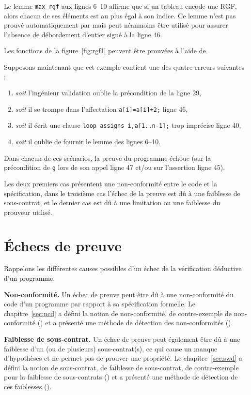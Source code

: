 Le lemme \lstinline'max_rgf' aux lignes 6--10 affirme que si un tableau
encode une RGF, alors chacun de ses éléments est au plus égal à son indice.
Ce lemme n'est pas prouvé automatiquement par \Wp mais peut néanmoins être
utilisé pour assurer l'absence de débordement d'entier signé à la ligne 46.

Les fonctions de la figure~\ref{fig:rgf1} peuvent être prouvées à l'aide de \Wp.

Supposons maintenant que cet exemple contient une des quatre erreurs suivantes :
\begin{enumerate}
\item \emph{soit} l'ingénieur validation oublie la précondition de la ligne 29,
\item \emph{soit} il se trompe dans l'affectation
  \lstinline[style=c]'a[i]=a[i]+2;' ligne 46,
\item \emph{soit} il écrit une clause
  \lstinline[style=c]'loop assigns i,a[1..n-1];' trop imprécise ligne 40,
\item \emph{soit} il oublie de fournir le lemme des lignes 6--10.
\end{enumerate}
Dans chacun de ces scénarios, la preuve du programme échoue (sur la précondition
de \lstinline{g} lors de son appel ligne 47 et/ou sur l'assertion ligne 45).

Les deux premiers cas présentent une non-conformité entre le code et
la spécification, dans le troisième cas l'échec de la preuve est dû à une
faiblesse de sous-contrat, et le dernier cas est dû à une limitation ou une
faiblesse du prouveur utilisé.


\section{Échecs de preuve}
\label{sec:method-proof-failures}


Rappelons les différentes causes possibles d'un échec de la vérification
déductive d'un programme.

\textbf{Non-conformité.}
Un échec de preuve peut être dû à une non-conformité du code d'un programme par
rapport à sa spécification formelle.
Le chapitre~\ref{sec:ncd} a défini la notion de non-conformité, de
contre-exemple de non-conformité (\NCCE) et a présenté une méthode de détection
des non-conformités (\NCD).

\textbf{Faiblesse de sous-contrat.}
Un échec de preuve peut également être dû à une faiblesse d'un (ou de plusieurs)
sous-contrat(s), ce qui cause un manque d'hypothèses et ne permet pas de prouver
une propriété.
Le chapitre~\ref{sec:swd} a défini la notion de sous-contrat, de faiblesse de
sous-contrat, de contre-exemple pour la faiblesse de sous-contrats (\SWCE) et
a présenté une méthode de détection de ces faiblesses (\SWD).

